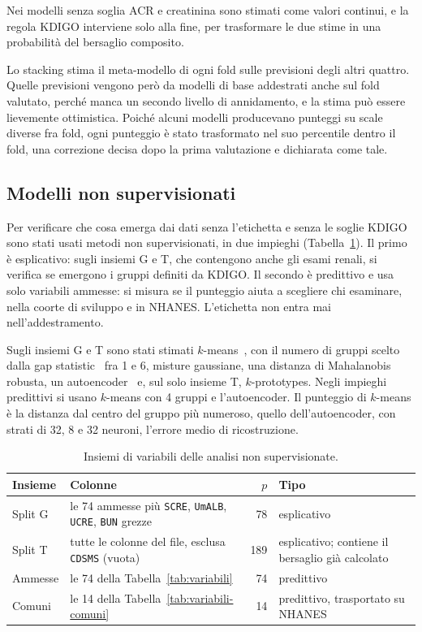 \documentclass[a4paper, 12pt, oneside]{book}
\begin{document}
Nei modelli senza soglia ACR e creatinina sono stimati come valori continui, e la regola KDIGO interviene solo alla fine, per trasformare le due stime in una probabilità del bersaglio composito.

Lo stacking stima il meta-modello di ogni fold sulle previsioni degli altri quattro. Quelle previsioni vengono però da modelli di base addestrati anche sul fold valutato, perché manca un secondo livello di annidamento, e la stima può essere lievemente ottimistica. Poiché alcuni modelli producevano punteggi su scale diverse fra fold, ogni punteggio è stato trasformato nel suo percentile dentro il fold, una correzione decisa dopo la prima valutazione e dichiarata come tale.

\subsection{Modelli non supervisionati}

Per verificare che cosa emerga dai dati senza l'etichetta e senza le soglie KDIGO sono stati usati metodi non supervisionati, in due impieghi (Tabella~\ref{tab:insiemi-nonsup}). Il primo è esplicativo: sugli insiemi G e T, che contengono anche gli esami renali, si verifica se emergono i gruppi definiti da KDIGO. Il secondo è predittivo e usa solo variabili ammesse: si misura se il punteggio aiuta a scegliere chi esaminare, nella coorte di sviluppo e in NHANES. L'etichetta non entra mai nell'addestramento.

Sugli insiemi G e T sono stati stimati $k$-means~\cite{lloyd_least_1982}, con il numero di gruppi scelto dalla gap statistic~\cite{tibshirani_estimating_2001} fra 1 e 6, misture gaussiane, una distanza di Mahalanobis robusta, un autoencoder~\cite{hinton_reducing_2006} e, sul solo insieme T, $k$-prototypes. Negli impieghi predittivi si usano $k$-means con 4 gruppi e l'autoencoder. Il punteggio di $k$-means è la distanza dal centro del gruppo più numeroso, quello dell'autoencoder, con strati di 32, 8 e 32 neuroni, l'errore medio di ricostruzione.

\begin{table}[H]
	\centering
	\small
	\caption{Insiemi di variabili delle analisi non supervisionate.}
	\label{tab:insiemi-nonsup}
	\begin{tabularx}{\textwidth}{@{}l >{\raggedright\arraybackslash}X r l@{}}
		\toprule
		Insieme & Colonne & $p$ & Tipo \\
		\midrule
		Split G & le 74 ammesse più \texttt{SCRE}, \texttt{UmALB}, \texttt{UCRE}, \texttt{BUN} grezze & 78 & esplicativo \\
		Split T & tutte le colonne del file, esclusa \texttt{CDSMS} (vuota) & 189 & esplicativo; contiene il bersaglio già calcolato \\
		Ammesse & le 74 della Tabella~\ref{tab:variabili} & 74 & predittivo \\
		Comuni & le 14 della Tabella~\ref{tab:variabili-comuni} & 14 & predittivo, trasportato su NHANES \\
		\bottomrule
	\end{tabularx}
\end{table}
\end{document}

